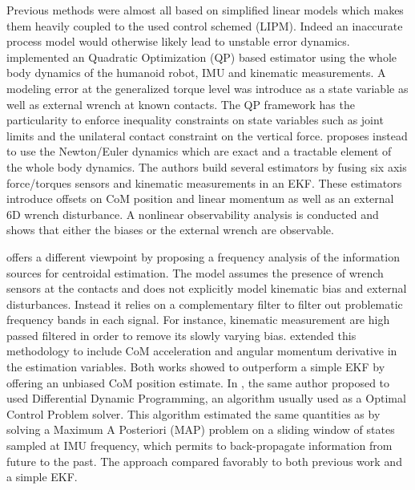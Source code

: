 Previous methods were almost all based on simplified linear models which makes them heavily coupled to the used control schemed (LIPM). Indeed an inaccurate process model
would otherwise likely lead to unstable error dynamics. \cite{xinjilefu2014dynamic} implemented an Quadratic Optimization (QP) based estimator using the whole body dynamics
of the humanoid robot, IMU and kinematic measurements. A modeling error at the generalized torque level was introduce as a state variable as well as external wrench at known contacts. 
The QP framework has the particularity to enforce inequality constraints on state variables such as joint limits and the unilateral contact constraint on the vertical force.
\cite{rotella2015humanoid} proposes instead to use the Newton/Euler dynamics which are exact and a tractable element of the whole body dynamics. 
The authors build several estimators by fusing six axis force/torques sensors and kinematic measurements in an EKF. 
These estimators introduce offsets on CoM position and linear momentum as well as an external 6D wrench disturbance. A nonlinear observability analysis is conducted 
and shows that either the biases or the external wrench are observable. 

\cite{carpentier2016center} offers a different viewpoint by proposing a frequency analysis of the information sources for centroidal estimation. The model
assumes the presence of wrench sensors at the contacts and does not explicitly model kinematic bias and external disturbances. Instead it relies on a complementary filter
to filter out problematic frequency bands in each signal. For instance, kinematic measurement are high passed filtered in order to remove its slowly varying bias. 
\cite{bailly2019recursive} extended this methodology to include CoM acceleration and angular momentum derivative in the estimation variables. Both works showed to outperform
a simple EKF by offering an unbiased CoM position estimate.
In \cite{bailly2021optimal}, the same author proposed to used Differential Dynamic Programming, an algorithm usually used as a Optimal Control Problem solver.
This algorithm estimated the same quantities as \cite{bailly2019recursive} by solving a Maximum A Posteriori (MAP) problem on a sliding window of states sampled at IMU frequency, 
which permits to back-propagate information from future to the past. The approach compared favorably to both previous work \cite{bailly2019recursive} and a simple EKF.





